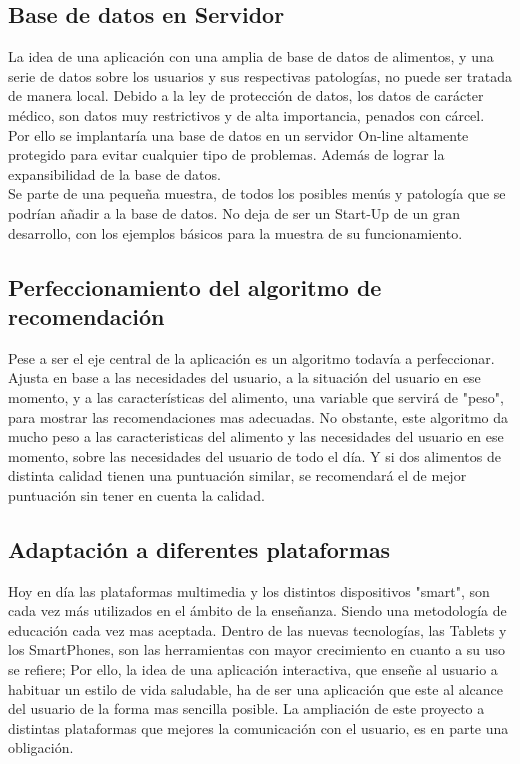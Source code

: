 \subsection{Base de datos en Servidor}
La idea de una aplicación con una amplia de base de datos de alimentos, y una serie de datos sobre los usuarios y sus respectivas patologías, no puede ser tratada de manera local. Debido a la ley de protección de datos, los datos de carácter médico, son datos muy restrictivos y de alta importancia, penados con cárcel.\\
Por ello se implantaría una base de datos en un servidor On-line altamente protegido para evitar cualquier tipo de problemas. Además de lograr la expansibilidad de la base de datos.\\
Se parte de una pequeña muestra, de todos los posibles menús y patología que se podrían añadir a la base de datos. No deja de ser un Start-Up de un gran desarrollo, con los ejemplos básicos para la muestra de su funcionamiento.

\subsection{Perfeccionamiento del algoritmo de recomendación}
Pese a ser el eje central de la aplicación es un algoritmo todavía a perfeccionar. Ajusta en base a las necesidades del usuario, a la situación del usuario en ese momento, y a las características del alimento, una variable que servirá de "peso", para mostrar las recomendaciones mas adecuadas. No obstante, este algoritmo da mucho peso a las caracteristicas del alimento y las necesidades del usuario en ese momento, sobre las necesidades del usuario de todo el día. Y si dos alimentos de distinta calidad tienen una puntuación similar, se recomendará el de mejor puntuación sin tener en cuenta la calidad.

\subsection{Adaptación a diferentes plataformas}
Hoy en día las plataformas multimedia y los distintos dispositivos "smart", son cada vez más utilizados en el ámbito de la enseñanza. Siendo una metodología de educación cada vez mas aceptada. Dentro de las nuevas tecnologías, las Tablets y los SmartPhones, son las herramientas con mayor crecimiento en cuanto a su uso se refiere; Por ello, la idea de una aplicación interactiva, que enseñe al usuario a habituar un estilo de vida saludable, ha de ser una aplicación que este al alcance del usuario de la forma mas sencilla posible. La ampliación de este proyecto a distintas plataformas que mejores la comunicación con el usuario, es en parte una obligación.
